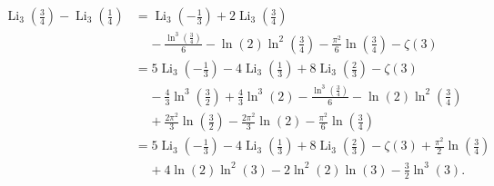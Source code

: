 \begin{align}
\operatorname{Li}_{3}{\left(\frac34\right)}-\operatorname{Li}_{3}{\left(\frac14\right)}
&=\operatorname{Li}_{3}{\left(-\frac13\right)}+2\operatorname{Li}_{3}{\left(\frac34\right)}\\
&~~~~~ -\frac{\ln^3{\left(\frac34\right)}}{6}-\ln{(2)}\ln^2{\left(\frac34\right)}-\frac{\pi^2}{6}\ln{\left(\frac34\right)}-\zeta{(3)}\\
&=5\operatorname{Li}_{3}{\left(-\frac13\right)}-4\operatorname{Li}_{3}{\left(\frac13\right)}+8\operatorname{Li}_{3}{\left(\frac23\right)}-\zeta{(3)}\\
&~~~~~ -\frac43\ln^3{\left(\frac32\right)}+\frac43\ln^3{(2)}-\frac{\ln^3{\left(\frac34\right)}}{6}-\ln{(2)}\ln^2{\left(\frac34\right)}\\
&~~~~~ +\frac{2\pi^2}{3}\ln{\left(\frac32\right)}-\frac{2\pi^2}{3}\ln{(2)}-\frac{\pi^2}{6}\ln{\left(\frac34\right)}\\
&=5\operatorname{Li}_{3}{\left(-\frac13\right)}-4\operatorname{Li}_{3}{\left(\frac13\right)}+8\operatorname{Li}_{3}{\left(\frac23\right)}-\zeta{(3)}+\frac{\pi^2}{2}\ln{\left(\frac34\right)}\\
&~~~~~ +4\ln{(2)}\ln^2{(3)}-2\ln^2{(2)}\ln{(3)}-\frac32\ln^3{(3)}.\\
\end{align}